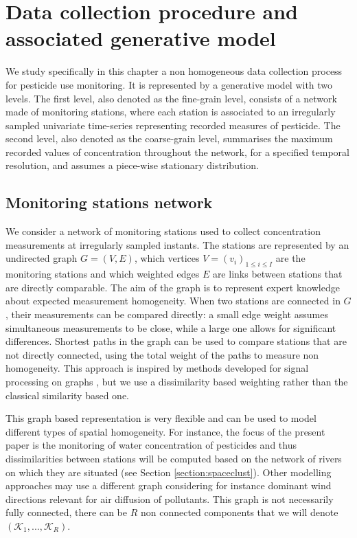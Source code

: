 \section{Data collection procedure and associated generative model}\label{section:data:model}

We study specifically in this chapter a non homogeneous data collection process for pesticide use monitoring. It is represented by a generative model with two levels. The first level, also denoted as the fine-grain level, consists of a network made of monitoring stations, where each station is associated to an irregularly sampled univariate time-series representing recorded measures of pesticide. The second level, also denoted as the coarse-grain level, summarises the maximum recorded values of concentration throughout the network, for a specified temporal resolution, and assumes a piece-wise stationary distribution. 

\subsection{Monitoring stations network}\label{subsection:graph}

We consider a network of monitoring stations used to collect concentration measurements at irregularly sampled instants. The stations are represented by an undirected graph $G=(V, E)$, which vertices $V=(v_i)_{1\leq i\leq I}$ are the monitoring stations and which weighted edges $E$ are links between stations that are directly comparable. The aim of the graph is to represent expert knowledge about expected measurement homogeneity. When two stations are connected in $G$, their measurements can be compared directly: a small edge weight assumes simultaneous measurements to be close, while a large one allows for significant differences. Shortest paths in the graph can be used to compare stations that are not directly connected, using the total weight of the paths to measure non homogeneity. This approach is inspired by methods developed for signal processing on graphs \cite{6494675}, but we use a dissimilarity based weighting rather than the classical similarity based one. 

This graph based representation is very flexible and can be used to model different types of spatial homogeneity. For instance, the focus of the present paper is the monitoring of water concentration of pesticides and thus dissimilarities between stations will be computed based on the network of rivers on which they are situated (see Section \ref{section:spaceclust}). Other modelling approaches may use a different graph considering for instance dominant wind directions relevant for air diffusion of pollutants. This graph is not necessarily fully connected, there can be $R$ non connected components that we will denote $(\mathcal{K}_1,...,\mathcal{K}_R)$.

